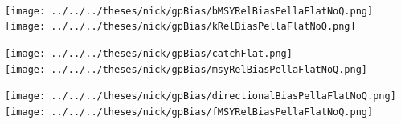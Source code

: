 \documentclass[ xcolor = pdftex, dvipsnames, table ]{beamer}
\begin{document}
{
\color{gray}
%
\begin{frame}%
$~$
\vspace*{-0.5cm}
\hspace*{-1.25cm}
\begin{minipage}[h!]{0.33\textwidth}
\hspace*{0.25cm}
\texttt{[image: ../../../theses/nick/gpBias/bMSYRelBiasPellaFlatNoQ.png]}\\
\hspace*{0.25cm}
\texttt{[image: ../../../theses/nick/gpBias/kRelBiasPellaFlatNoQ.png]}
\end{minipage}
\begin{minipage}[h!]{0.33\textwidth}
\hspace*{0.75cm}
\texttt{[image: ../../../theses/nick/gpBias/catchFlat.png]}\\
\hspace*{0.75cm}
\texttt{[image: ../../../theses/nick/gpBias/msyRelBiasPellaFlatNoQ.png]}
\end{minipage}
\begin{minipage}[h!]{0.33\textwidth}
\hspace*{1cm}
\texttt{[image: ../../../theses/nick/gpBias/directionalBiasPellaFlatNoQ.png]}\\
\hspace*{1cm}
\texttt{[image: ../../../theses/nick/gpBias/fMSYRelBiasPellaFlatNoQ.png]}
\end{minipage}
\end{frame}

}
\end{document}
